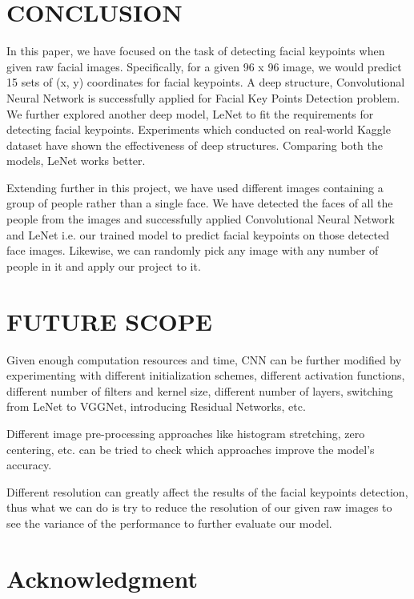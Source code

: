 \documentclass[conference]{IEEEtran}
\begin{document}
\section{CONCLUSION}

In this paper, we have focused on the task of detecting facial keypoints when given raw facial images. Specifically, for a given 96 x 96 image, we would predict 15 sets of (x, y) coordinates for facial keypoints. A deep structure, Convolutional Neural Network is successfully applied for Facial Key Points Detection problem. We further explored another deep model, LeNet to fit the requirements for detecting facial keypoints. Experiments which conducted on real-world Kaggle dataset have shown the effectiveness of deep structures. Comparing both the models, LeNet works better.

Extending further in this project, we have used different images containing a group of people rather than a single face. We have detected the faces of all the people from the images and successfully applied Convolutional Neural Network and LeNet i.e. our trained model to predict facial keypoints on those detected face images. Likewise, we can randomly pick any image with any number of people in it and apply our project to it.


\section{FUTURE SCOPE}

Given enough computation resources and time, CNN can be further modified by experimenting with different initialization schemes, different activation functions, different number of filters and kernel size, different number of layers, switching from LeNet to VGGNet, introducing Residual Networks, etc.  

    
Different image pre-processing approaches like histogram stretching, zero centering, etc. can be tried to check which approaches improve the model’s accuracy. 
 
    
Different resolution can greatly affect the results of the facial keypoints detection, thus what we can do is try to reduce the resolution of our given raw images to see the variance of the performance to further evaluate our model.




\section*{Acknowledgment}
\end{document}
